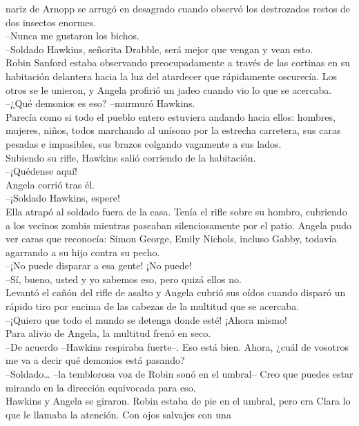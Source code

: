 nariz de Arnopp se arrugó en desagrado cuando observó los destrozados
restos de dos insectos enormes.\\
--Nunca me gustaron los bichos.\\[2\baselineskip]--Soldado Hawkins,
señorita Drabble, será mejor que vengan y vean esto.\\
Robin Sanford estaba observando preocupadamente a través de las cortinas
en su habitación delantera hacia la luz del atardecer que rápidamente
oscurecía. Los otros se le unieron, y Angela profirió un jadeo cuando
vio lo que se acercaba.\\
--¿Qué demonios es eso? --murmuró Hawkins.\\
Parecía como si todo el pueblo entero estuviera andando hacia ellos:
hombres, mujeres, niños, todos marchando al unísono por la estrecha
carretera, sus caras pesadas e impasibles, sus brazos colgando vagamente
a sus lados.\\
Subiendo su rifle, Hawkins salió corriendo de la habitación.\\
--¡Quédense aquí!\\
Angela corrió tras él.\\
--¡Soldado Hawkins, espere!\\
Ella atrapó al soldado fuera de la casa. Tenía el rifle sobre su hombro,
cubriendo a los vecinos zombis mientras paseaban silenciosamente por el
patio. Angela pudo ver caras que reconocía: Simon George, Emily Nichols,
incluso Gabby, todavía agarrando a su hijo contra su pecho.\\
--¡No puede disparar a esa gente! ¡No puede!\\
--Sí, bueno, usted y yo sabemos eso, pero quizá ellos no.\\
Levantó el cañón del rifle de asalto y Angela cubrió sus oídos cuando
disparó un rápido tiro por encima de las cabezas de la multitud que se
acercaba.\\
--¡Quiero que todo el mundo se detenga donde esté! ¡Ahora mismo!\\
Para alivio de Angela, la multitud frenó en seco.\\
--De acuerdo --Hawkins respiraba fuerte--. Eso está bien. Ahora, ¿cuál
de vosotros me va a decir qué demonios está pasando?\\
--Soldado\ldots{} --la temblorosa voz de Robin sonó en el umbral-- Creo
que puedes estar mirando en la dirección equivocada para eso.\\
Hawkins y Angela se giraron. Robin estaba de pie en el umbral, pero era
Clara lo que le llamaba la atención. Con ojos salvajes con una

